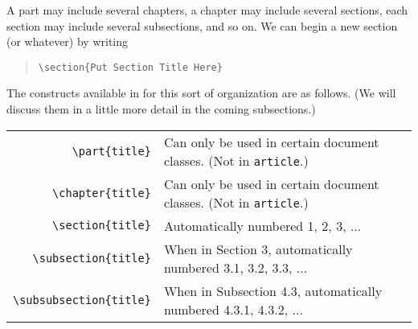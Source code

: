 \documentclass[letterpaper,twoside,10pt]{article}
\begin{document}
A part may include several chapters, a chapter may include several sections, each section may
include several subsections, and so on. We can begin a new section (or whatever) by writing

\begin{quote}
 \verb!\section{Put Section Title Here}!
\end{quote}

\newpage
The constructs available in {\LaTeXe} for this sort of organization are as follows. (We will discuss
them in a little more detail in the coming subsections.)

\begin{center}
 \begin{tabular}{rl}
  \small\verb!\part{title}! & \small Can only be used in certain document classes. (Not in \texttt{article}.)\\
  \small\verb!\chapter{title}! & \small Can only be used in certain document classes. (Not in \texttt{article}.)\\
  \small\verb!\section{title}! & \small Automatically numbered 1, 2, 3, ...\\
  \small\verb!\subsection{title}! & \small When in Section 3, automatically numbered 3.1, 3.2, 3.3, ...\\
  \small\verb!\subsubsection{title}! & \small When in Subsection 4.3, automatically numbered 4.3.1, 4.3.2, ...\\
 \end{tabular}
\end{center}
\end{document}
